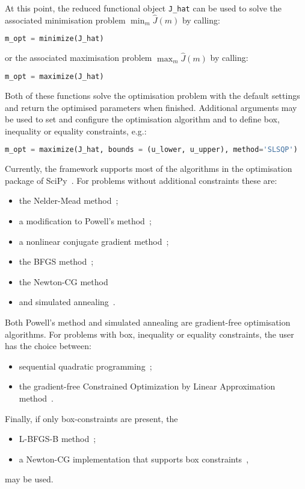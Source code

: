 \documentclass[prodmode,acmtoms]{acmsmall}
\begin{document}
At this point, the reduced functional object \texttt{J\_hat} can be used to solve the associated minimisation problem $\min_m \hat J(m)$ by calling:
\begin{lstlisting}[language=Python,numbers=none]
      m_opt = minimize(J_hat)
\end{lstlisting}
or the associated maximisation problem $\max_m \hat J(m)$ by calling:
\begin{lstlisting}[language=Python,numbers=none]
      m_opt = maximize(J_hat)
\end{lstlisting}
Both of these functions solve the optimisation problem with the default settings and return the optimised parameters when finished. 
Additional arguments may be used to set and configure the optimisation algorithm and to define box, inequality or equality constraints, e.g.: 
\begin{lstlisting}[language=Python,numbers=none]
m_opt = maximize(J_hat, bounds = (u_lower, u_upper), method='SLSQP')
\end{lstlisting}

Currently, the framework supports most of the algorithms in the optimisation package of SciPy~\cite{scipy}.
For problems without additional constraints these are: 
\begin{itemize}
\item the Nelder-Mead method~\cite{nelder1965};
\item a modification to Powell's method~\cite{powell1964};
\item a nonlinear conjugate gradient method~\cite[\S 5.2]{wright2006};
\item the BFGS method~\cite[\S 6.1]{wright2006}; 
\item the Newton-CG method~\cite[\S 7.1]{wright2006} 
\item and simulated annealing~\cite{laarhoven1987}.
\end{itemize}
Both Powell's method and simulated annealing are gradient-free optimisation algorithms. 
For problems with box, inequality or equality constraints, the user has the choice between:
\begin{itemize}
 \item sequential quadratic programming~\cite{kraft1994};
\item the gradient-free Constrained Optimization by Linear Approximation method~\cite{powell1994}.
\end{itemize}
Finally, if only box-constraints are present, the 
\begin{itemize}
 \item L-BFGS-B method~\cite[\S 7.2]{wright2006};
 \item a Newton-CG implementation that supports box constraints~\cite{nash1984},
\end{itemize}
 may be used. 
 
\end{document}
